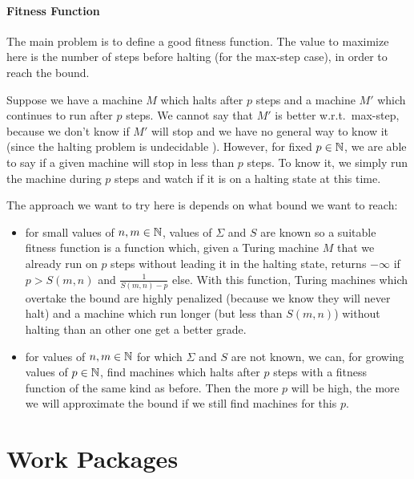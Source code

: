 \documentclass{article}
\begin{document}
\paragraph{Fitness Function}
The main problem is to define a good fitness function. The value to maximize here is the number of steps before halting (for the max-step case), in order to reach the bound.

Suppose we have a machine $M$ which halts after $p$ steps and a machine $M'$ which continues to run after $p$ steps.
We cannot say that $M'$ is better w.r.t.\ max-step, because we don't know if $M'$ will stop and we have no general way to know it (since the halting problem is undecidable \cite{turing}).
However, for fixed $p \in \mathbb{N}$, we are able to say if a given machine will stop in less than $p$ steps. To know it, we simply run the machine during $p$ steps and watch if it is on a halting state at this time.

The approach we want to try here is depends on what bound we want to reach:
\begin{itemize}
\item for small values of $n,m \in \mathbb{N}$, values of $\Sigma$ and $S$ are known \cite{rado} so a suitable fitness function is a function which, given a Turing machine $M$ that we already run on $p$ steps without leading it in the halting state, returns $- \infty$ if $p > S(m,n)$ and $\frac{1}{S(m,n) - p}$ else. With this function, Turing machines which overtake the bound are highly penalized (because we know they will never halt) and a machine which run longer (but less than $S(m,n)$) without halting than an other one get a better grade.

\item for values of $n, m \in \mathbb{N}$ for which $\Sigma$ and $S$ are not known, we can, for growing values of $p \in \mathbb{N}$, find machines which halts after $p$ steps with a fitness function of the same kind as before. Then the more $p$ will be high, the more we will approximate the bound if we still find machines for this $p$.
\end{itemize}


\section{Work  Packages}
\end{document}
